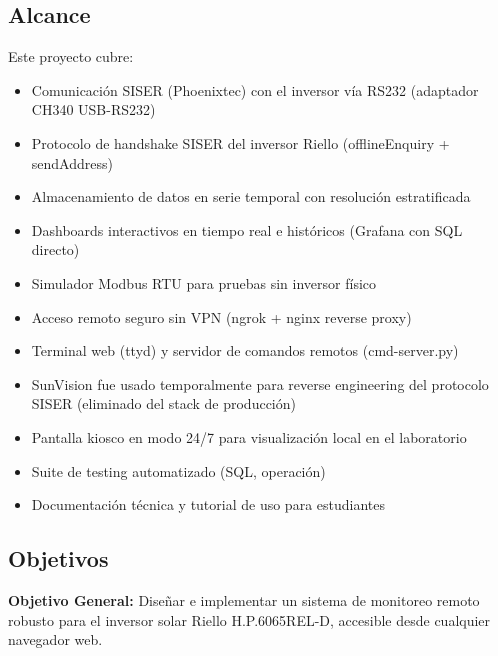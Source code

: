 \documentclass[12pt,a4paper]{article}
\begin{document}
\subsection{Alcance}

Este proyecto cubre:
\begin{itemize}
    \item Comunicaci\'on SISER (Phoenixtec) con el inversor v\'ia RS232 (adaptador CH340 USB-RS232)
    \item Protocolo de handshake SISER del inversor Riello (offlineEnquiry + sendAddress)
    \item Almacenamiento de datos en serie temporal con resoluci\'on estratificada
    \item Dashboards interactivos en tiempo real e hist\'oricos (Grafana con SQL directo)
    \item Simulador Modbus RTU para pruebas sin inversor f\'isico
    \item Acceso remoto seguro sin VPN (ngrok + nginx reverse proxy)
    \item Terminal web (ttyd) y servidor de comandos remotos (cmd-server.py)
    \item SunVision fue usado temporalmente para reverse engineering del protocolo SISER (eliminado del stack de producci\'on)
    \item Pantalla kiosco en modo 24/7 para visualizaci\'on local en el laboratorio
    \item Suite de testing automatizado (SQL, operaci\'on)
    \item Documentaci\'on t\'ecnica y tutorial de uso para estudiantes
\end{itemize}

\subsection{Objetivos}

\textbf{Objetivo General:} Dise\~nar e implementar un sistema de monitoreo remoto robusto para el inversor solar Riello H.P.6065REL-D, accesible desde cualquier navegador web.
\end{document}
